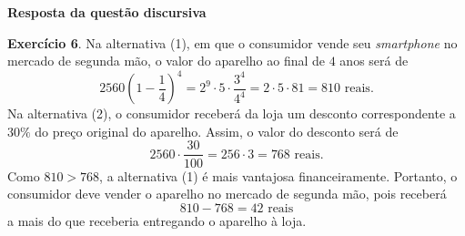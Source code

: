 %
%
\begin{center}
    \large{\textbf{Resposta da questão discursiva}}
\end{center}
\vspace{20pt}
    
\textbf{Exercício 6}. Na alternativa (1), em que o consumidor vende seu \textit{smartphone} no mercado de segunda mão, o valor do aparelho ao final de \(4\) anos será de
%
\[
    2560\left(1-\dfrac{1}{4}\right)^{4}
    = 2^{9}\cdot 5\cdot\dfrac{3^{4}}{4^{4}}
    = 2\cdot5\cdot81
    = 810\text{ reais}.
\]
%
Na alternativa (2), o consumidor receberá da loja um desconto correspondente a \(30\%\) do preço original do aparelho. Assim, o valor do desconto será de
%
\[
    2560\cdot\dfrac{30}{100}
    = 256\cdot3
    = 768\text{ reais}.
\]
%
Como \(810>768\), a alternativa (1) é mais vantajosa financeiramente. Portanto, o consumidor deve vender o aparelho no mercado de segunda mão, pois receberá
%
\[
    810-768=42\text{ reais}
\]
%
a mais do que receberia entregando o aparelho à loja.
